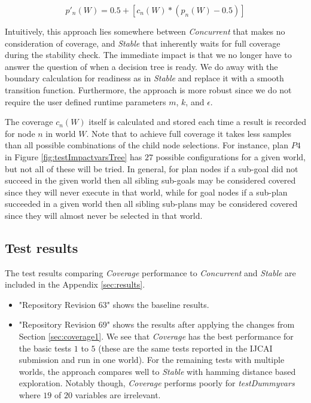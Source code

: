 \documentclass[a4paper]{article}
\newcommand{\cc}{\emph{Concurrent}\xspace}
\newcommand{\st}{\emph{Stable}\xspace}
\newcommand{\cov}{\emph{Coverage}\xspace}
\newcommand{\dt}{{decision tree}\xspace}
\begin{document}
\begin{equation}
\label{eqn:coverage}   
p'_n(W)= 0.5 + \left[  c_n(W) *  \left( p_n(W) - 0.5 \right)  \right]
\end{equation}

Intuitively, this approach lies somewhere between \cc that makes no consideration of coverage, and \st that inherently waits for full coverage during the stability check. The immediate impact is that we no longer have to answer the question of when a \dt is ready. We do away with the boundary calculation for readiness as in \st and replace it with a smooth transition function. Furthermore, the approach is more robust since we do not require the user defined runtime parameters  $m$, $k$, and $\epsilon$.

The coverage $c_n(W)$ itself is calculated and stored each time a result is recorded for node $n$ in world $W$. Note that to achieve full coverage it takes less samples than all possible combinations of the child node selections. For instance, plan $P4$ in Figure \ref{fig:testImpactvarsTree} has $27$ possible configurations for a given world, but not all of these will be tried. In general, for plan nodes if a sub-goal did not succeed in the given world then all sibling sub-goals may be considered covered since they will never execute in that world, while for goal nodes if a sub-plan succeeded in a given world then all sibling sub-plans may be considered covered since they will almost never be selected in that world.
                     
\subsection{Test results}
The test results comparing \cov performance to \cc and \st are included in the Appendix \ref{sec:results}.
\begin{itemize}
\item "Repository Revision 63" shows the baseline results.
\item "Repository Revision 69" shows the results after applying the changes from Section \ref{sec:coverage1}. We see that \cov has the best performance for the basic tests $1$ to $5$ (these are the same tests reported in the IJCAI submission and run in one world). For the remaining tests with multiple worlds, the approach compares well to \st with hamming distance based exploration. Notably though, \cov performs poorly for \textit{testDummyvars} where $19$ of $20$ variables are irrelevant.
\end{itemize}
\end{document}
